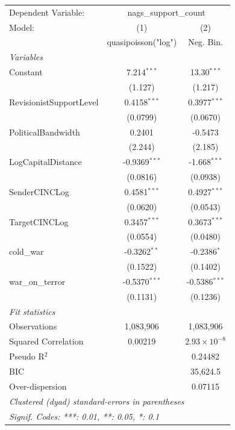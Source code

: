 
\begingroup
\centering
\begin{tabular}{lcc}
   \tabularnewline \midrule \midrule
   Dependent Variable: & \multicolumn{2}{c}{nags\_support\_count}\\
   Model:                  & (1)                  & (2)\\  
                           &  quasipoisson("log") & Neg. Bin.\\  
   \midrule
   \emph{Variables}\\
   Constant                & 7.214$^{***}$        & 13.30$^{***}$\\   
                           & (1.127)              & (1.217)\\   
   RevisionistSupportLevel & 0.4158$^{***}$       & 0.3977$^{***}$\\   
                           & (0.0799)             & (0.0670)\\   
   PoliticalBandwidth      & 0.2401               & -0.5473\\   
                           & (2.244)              & (2.185)\\   
   LogCapitalDistance      & -0.9369$^{***}$      & -1.668$^{***}$\\   
                           & (0.0816)             & (0.0938)\\   
   SenderCINCLog           & 0.4581$^{***}$       & 0.4927$^{***}$\\   
                           & (0.0620)             & (0.0543)\\   
   TargetCINCLog           & 0.3457$^{***}$       & 0.3673$^{***}$\\   
                           & (0.0554)             & (0.0480)\\   
   cold\_war               & -0.3262$^{**}$       & -0.2386$^{*}$\\   
                           & (0.1522)             & (0.1402)\\   
   war\_on\_terror         & -0.5370$^{***}$      & -0.5386$^{***}$\\   
                           & (0.1131)             & (0.1236)\\   
   \midrule
   \emph{Fit statistics}\\
   Observations            & 1,083,906            & 1,083,906\\  
   Squared Correlation     & 0.00219              & $2.93\times 10^{-8}$\\   
   Pseudo R$^2$            &                      & 0.24482\\  
   BIC                     &                      & 35,624.5\\  
   Over-dispersion         &                      & 0.07115\\  
   \midrule \midrule
   \multicolumn{3}{l}{\emph{Clustered (dyad) standard-errors in parentheses}}\\
   \multicolumn{3}{l}{\emph{Signif. Codes: ***: 0.01, **: 0.05, *: 0.1}}\\
\end{tabular}
\par\endgroup


